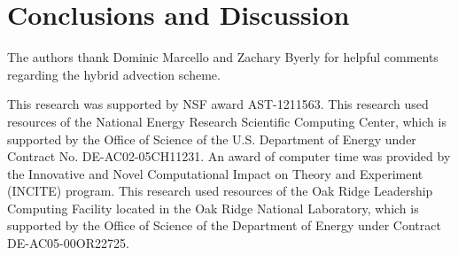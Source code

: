 \documentclass[twocolumn,numberedappendix]{../aastex6}
\begin{document}
\section{Conclusions and Discussion}\label{sec:Conclusions and Discussion}


\acknowledgments

The authors thank Dominic Marcello and Zachary Byerly for helpful comments
regarding the hybrid advection scheme.

This research was supported by NSF award AST-1211563.  This research
used resources of the National Energy Research Scientific Computing
Center, which is supported by the Office of Science of the
U.S. Department of Energy under Contract No. DE-AC02-05CH11231.  An
award of computer time was provided by the Innovative and Novel
Computational Impact on Theory and Experiment (INCITE) program.  This
research used resources of the Oak Ridge Leadership Computing Facility
located in the Oak Ridge National Laboratory, which is supported by
the Office of Science of the Department of Energy under Contract
DE-AC05-00OR22725.

\clearpage





\clearpage
\appendix
\end{document}
